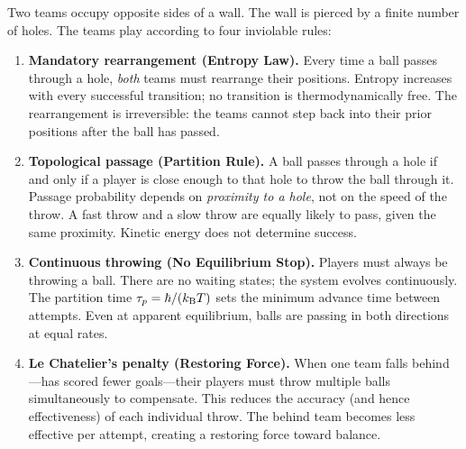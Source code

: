 \begin{example}
\label{ex:ball_game}
Two teams occupy opposite sides of a wall. The wall is pierced by a finite
number of holes. The teams play according to four inviolable rules:
\begin{enumerate}[label=(\roman*)]
  \item \textbf{Mandatory rearrangement (Entropy Law).} Every time a ball
        passes through a hole, \emph{both} teams must rearrange their positions.
        Entropy increases with every successful transition; no transition is
        thermodynamically free. The rearrangement is irreversible: the teams
        cannot step back into their prior positions after the ball has passed.

  \item \textbf{Topological passage (Partition Rule).} A ball passes through
        a hole if and only if a player is close enough to that hole to throw
        the ball through it. Passage probability depends on \emph{proximity
        to a hole}, not on the speed of the throw. A fast throw and a slow
        throw are equally likely to pass, given the same proximity. Kinetic
        energy does not determine success.

  \item \textbf{Continuous throwing (No Equilibrium Stop).} Players must
        always be throwing a ball. There are no waiting states; the system
        evolves continuously. The partition time $\tau_p = \hbar/(k_{\mathrm{B}} T)$ sets
        the minimum advance time between attempts. Even at apparent equilibrium,
        balls are passing in both directions at equal rates.

  \item \textbf{Le Chatelier's penalty (Restoring Force).} When one team
        falls behind---has scored fewer goals---their players must throw multiple
        balls simultaneously to compensate. This reduces the accuracy (and hence
        effectiveness) of each individual throw. The behind team becomes less
        effective per attempt, creating a restoring force toward balance.
\end{enumerate}
\end{example}

